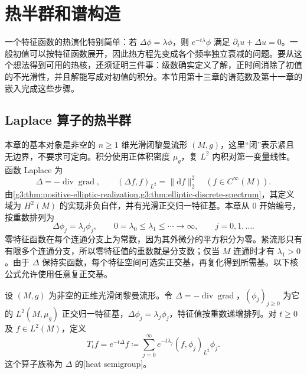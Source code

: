 
% 
% 

\section{热半群和谱构造}
\label{g3:sec:1601}

一个特征函数的热演化特别简单：若 \(\Delta\phi=\lambda\phi\)，则 \(e^{-t\lambda}\phi\) 满足 \(\partial_tu+\Delta u=0\)。一般初值可以按特征函数展开，因此热方程先变成各个频率独立衰减的问题。要从这个想法得到可用的热核，还须证明三件事：级数确实定义了解，正时间消除了初值的不光滑性，并且解能写成对初值的积分。本节用第十三章的谱范数及第十一章的嵌入完成这些步骤。

\subsection{Laplace 算子的热半群}
\label{g3:subsec:1601:01}

本章的基本对象是非空的 \(n\ge1\) 维光滑闭黎曼流形 \((M,g)\)，这里“闭”表示紧且无边界，不要求可定向。积分使用正体积密度 \(\mu_g\)，复 \(L^2\) 内积对第一变量线性。函数 Laplace 为
\[
	\Delta=-\operatorname{div}\operatorname{grad},\qquad
	(\Delta f,f)_{L^2}=\|\mathrm df\|_2^2\quad(f\in C^\infty(M)).
\]
由\cref{g3:thm:positive-elliptic-realization,g3:thm:elliptic-discrete-spectrum}，其定义域为 \(H^2(M)\) 的实现非负自伴，并有光滑正交归一特征基。本章从 \(0\) 开始编号，按重数排列为
\begin{equation}\label{g3:eq:heat-spectrum-enumeration}
	\Delta\phi_j=\lambda_j\phi_j,\qquad
	0=\lambda_0\le\lambda_1\le\cdots\longrightarrow\infty,
	\qquad j=0,1,\ldots.
\end{equation}
零特征函数在每个连通分支上为常数，因为其外微分的平方积分为零。紧流形只有有限多个连通分支，所以零特征值的重数就是分支数；仅当 \(M\) 连通时才有 \(\lambda_1>0\)。由于 \(\Delta\) 保持实函数，每个特征空间可选实正交基，再复化得到所需基。以下核公式允许使用任意复正交基。

\begin{definition}\label{g3:def:heat-semigroup}
	设 \((M,g)\) 为非空的正维光滑闭黎曼流形。令 \(\Delta=-\operatorname{div}\operatorname{grad}\)，\((\phi_j)_{j\ge0}\) 为它的 \(L^2(M,\mu_g)\) 正交归一特征基，\(\Delta\phi_j=\lambda_j\phi_j\)，特征值按重数递增排列。对 \(t\ge0\) 及 \(f\in L^2(M)\)，定义
	\begin{equation}\label{g3:eq:heat-semigroup-series}
		T_tf=e^{-t\Delta}f\coloneqq
		\sum_{j=0}^{\infty}e^{-t\lambda_j}(f,\phi_j)_{L^2}\phi_j.
	\end{equation}
	这个算子族称为 \(\Delta\) 的[heat semigroup]。
\end{definition}

